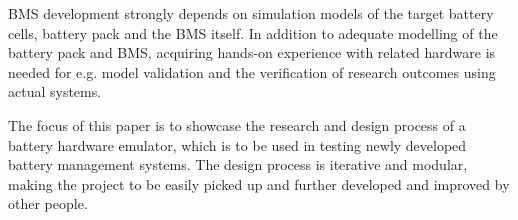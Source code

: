 BMS development strongly depends on simulation models of the target
battery cells, battery pack and the BMS itself. In addition to adequate modelling 
of the battery pack and BMS, acquiring hands-on experience with related
hardware is needed for e.g. model validation and the verification of 
research outcomes using actual systems.

The focus of this paper is to showcase the research and design process of 
a battery hardware emulator, which is to be used in testing newly developed 
battery management systems. The design process is iterative and modular, 
making the project to be easily picked up and further developed and improved 
by other people.  